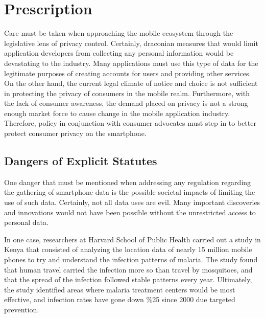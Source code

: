 \section{Prescription}


Care must be taken when approaching the mobile ecosystem through the legislative lens of privacy control. Certainly, draconian measures that would limit application developers from collecting any personal information would be devastating to the industry. Many applications must use this type of data for the legitimate purposes of creating accounts for users and providing other services. On the other hand, the current legal climate of notice and choice is not sufficient in protecting the privacy of consumers in the mobile realm. 
Furthermore, with the lack of consumer awareness, the demand placed on privacy is not a strong enough market force to cause change in the mobile application industry. 
Therefore, policy in conjunction with consumer advocates must step in to better protect consumer privacy on the smartphone. 








	\subsection{Dangers of Explicit Statutes} 

One danger that must be mentioned when addressing any regulation regarding the gathering of smartphone data is the possible societal impacts of limiting the use of such data. Certainly, not all data uses are evil. Many important discoveries and innovations would not have been possible without the unrestricted access to personal data. 

In one case, researchers at Harvard School of Public Health carried out a study in Kenya that consisted of analyzing the location data of nearly 15 million mobile phones to try and understand the infection patterns of malaria\cite{unlock}. The study found that human travel carried the infection more so than travel by mosquitoes, and that the spread of the infection followed stable patterns every year. Ultimately, the study identified areas where malaria treatment centers would be most effective, and infection rates have gone down \%25 since 2000 due targeted prevention. 

